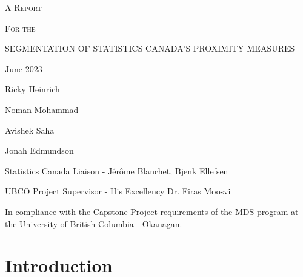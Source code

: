 \documentclass[11pt, a4paper]{article}
\begin{document}
\begin{center}
\textsc{A Report} \par
\small{\textsc{For the}} \par
\Large{\textsc{SEGMENTATION OF STATISTICS CANADA’S PROXIMITY MEASURES}}
\par
\vspace{0.917 pc} %
\par
\normalsize{ }

\thispagestyle{empty}

\vspace{8 pc} %


\par
June 2023	
\par
\vspace{8pc}

Ricky Heinrich \par
Noman Mohammad \par
Avishek Saha \par 
Jonah Edmundson


\par
\vfill
\thispagestyle{empty}
\par
\noindent\small{Statistics Canada Liaison - Jérôme Blanchet, Bjenk Ellefsen}
\par
\noindent\small{UBCO Project Supervisor - His Excellency Dr. Firas Moosvi}
\par
\vspace{2pc}
\par
\noindent\tiny{In compliance with the Capstone Project requirements of the MDS program at the University of British Columbia - Okanagan.}
\end{center}
\normalsize

\pagebreak



\thispagestyle{empty}
\tableofcontents
\thispagestyle{empty}

\pagebreak
\thispagestyle{empty}
\listoffigures
\thispagestyle{empty}

\vspace{2pc}

\pagebreak
\thispagestyle{empty}
\listoftables
\pagebreak


\section{Introduction}
\par
\end{document}
